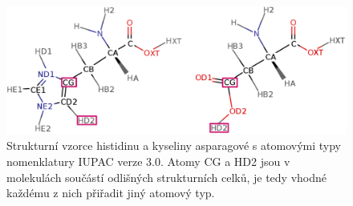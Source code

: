 \begin{figure}[h]
\label{aa_different_atom_types}
\begin{center}
\includegraphics[width=13cm]{pictures/asp_his_merged_squares.png}
\caption{Strukturní vzorce histidinu a kyseliny asparagové s atomovými typy nomenklatury IUPAC verze 3.0. Atomy CG a HD2 jsou v molekulách součástí odlišných strukturních celků, je tedy vhodné každému z nich přiřadit jiný atomový typ.}
\end{center}
\end{figure}




 



